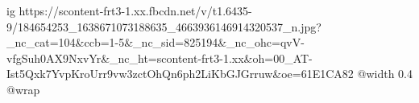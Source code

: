  
 
 
 
 

\ifcmt
  ig https://scontent-frt3-1.xx.fbcdn.net/v/t1.6435-9/184654253_1638671073188635_4663936146914320537_n.jpg?_nc_cat=104&ccb=1-5&_nc_sid=825194&_nc_ohc=qvV-vfgSuh0AX9NxvYr&_nc_ht=scontent-frt3-1.xx&oh=00_AT-Ist5Qxk7YvpKroUrr9vw3zctOhQn6ph2LiKbGJGrruw&oe=61E1CA82
  @width 0.4
  @wrap 
\fi
